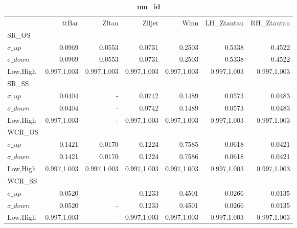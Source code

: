 \documentclass[11pt,oneside,a4paper]{article}
\begin{document}
\begin{table}
\caption{\bf{mu\_id}}
\centering
\begin{tabular}{lrrrrrr}
& ttBar & Zltau & Zlljet & Wlnu & LH\_Ztautau & RH\_Ztautau \\

SR\_OS &  &  &  &  &  &  \\
$\sigma\_up$ & 0.0969 & 0.0553 & 0.0731 & 0.2503 & 0.5338 & 0.4522 \\
$\sigma\_down$ & 0.0969 & 0.0553 & 0.0731 & 0.2503 & 0.5338 & 0.4522 \\
Low,High & 0.997,1.003 & 0.997,1.003 & 0.997,1.003 & 0.997,1.003 & 0.997,1.003 & 0.997,1.003 \\

\hline
SR\_SS &  &  &  &  &  &  \\
$\sigma\_up$ & 0.0404 & - & 0.0742 & 0.1489 & 0.0573 & 0.0483 \\
$\sigma\_down$ & 0.0404 & - & 0.0742 & 0.1489 & 0.0573 & 0.0483 \\
Low,High & 0.997,1.003 & - & 0.997,1.003 & 0.997,1.003 & 0.997,1.003 & 0.997,1.003 \\

\hline
WCR\_OS &  &  &  &  &  &  \\
$\sigma\_up$ & 0.1421 & 0.0170 & 0.1224 & 0.7585 & 0.0618 & 0.0421 \\
$\sigma\_down$ & 0.1421 & 0.0170 & 0.1224 & 0.7586 & 0.0618 & 0.0421 \\
Low,High & 0.997,1.003 & 0.997,1.003 & 0.997,1.003 & 0.997,1.003 & 0.997,1.003 & 0.997,1.003 \\

\hline
WCR\_SS &  &  &  &  &  &  \\
$\sigma\_up$ & 0.0520 & - & 0.1233 & 0.4501 & 0.0266 & 0.0135 \\
$\sigma\_down$ & 0.0520 & - & 0.1233 & 0.4501 & 0.0266 & 0.0135 \\
Low,High & 0.997,1.003 & - & 0.997,1.003 & 0.997,1.003 & 0.997,1.003 & 0.997,1.003 \\
\end{tabular}
\end{table}
\end{document}
